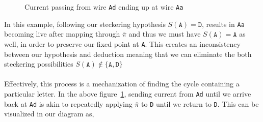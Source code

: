 \begin{figure}[H]
\begin{minipage}{0.45\textwidth}
  \end{minipage}
  \caption{Current passing from wire \texttt{Ad} ending up at wire \texttt{Aa}}
  \label{fig:incorrect_stecker}
\end{figure}
\noindent In this example, following our steckering hypothesis
$S(\texttt{A}) = \texttt{D}$,
results in \texttt{Aa} becoming live after mapping through $\overline\pi$ and
thus we must have $S(\texttt{A}) = \texttt{A}$ as well, in order to
preserve our fixed point at \texttt{A}.
This creates an inconsistency between our hypothesis and deduction
meaning that we can eliminate the both
steckering possibilities $S(\texttt{A}) \notin \{\texttt{A},
\texttt{D}\}$
\\\\Effectively, this process is a mechanization of
finding the cycle containing a particular letter. In the above
figure~\ref{fig:incorrect_stecker}, sending current from \texttt{Ad}
until we arrive back at \texttt{Ad} is
akin to repeatedly applying $\overline\pi$ to \texttt{D}
until we return to \texttt{D}. This can be visualized in our diagram as,

